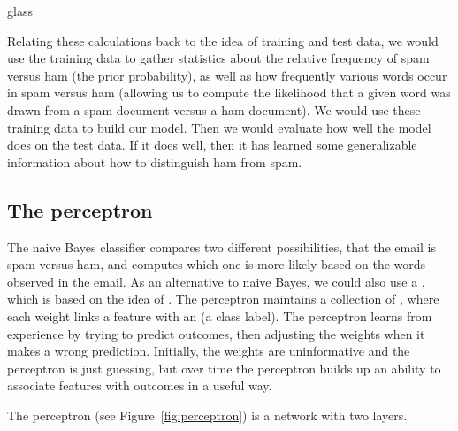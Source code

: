 \begin{tblsfilledsymbol}{}{glass}
\begin{underthehood}
Relating these calculations back to the idea of training and test data, we would use the training data to gather statistics about the relative frequency of spam versus ham (the prior probability), as well as how frequently various words occur in spam versus ham (allowing us to compute the likelihood that a given word was drawn from a spam document versus a ham document).  We would use these training data to build our model.  Then we would evaluate how well the model does on the test data.  If it does well, then it has learned some generalizable information about how to distinguish ham from spam.

\end{underthehood}
\end{tblsfilledsymbol}

\subsection{The perceptron}

The naive Bayes classifier compares two different possibilities, that the email is spam versus ham, and computes which one is more likely based on the words observed in the email.  As an alternative to naive Bayes, we could also use a
, which is based on the idea of . The perceptron maintains a collection of
, where each weight links a feature with an
 (a class label).  The perceptron learns from experience by trying to
predict outcomes, then adjusting the weights when it makes a wrong
prediction. Initially, the weights are uninformative and the perceptron
is just guessing, but over time the perceptron builds up an ability to
associate features with outcomes in a useful way.

The perceptron (see Figure~\ref{fig:perceptron}) is a network with two
layers. 

